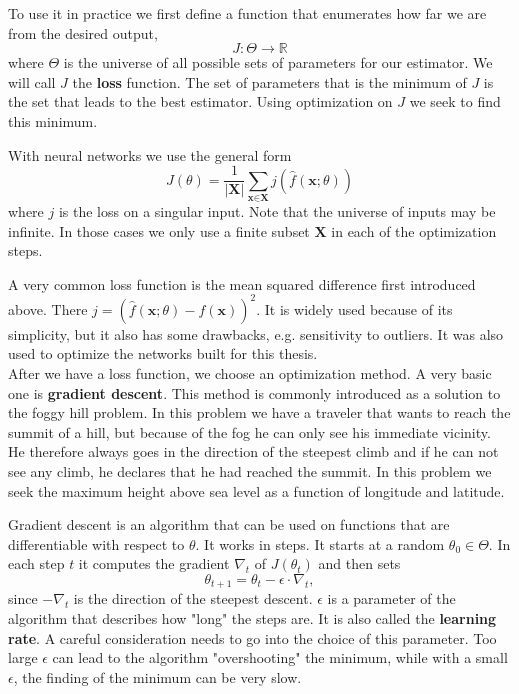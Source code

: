 To use it in practice we first define a function that enumerates how far we are from the desired output, $$J:\Theta\rightarrow\mathbb{R}$$ where $\Theta$ is the universe of all possible sets of parameters for our estimator. We will call $J$ the \textbf{loss} function. The set of parameters that is the minimum of $J$ is the set that leads to the best estimator. Using optimization on $J$ we seek to find this minimum. 

With neural networks we use the general form $$J(\theta) = \frac{1}{|\textbf{X}|} \sum_{\textbf{x}\in \textbf{X}}j(\widehat{f}(\textbf{x};\theta))$$ where $j$ is the loss on a singular input. Note that the universe of inputs may be infinite. In those cases we only use a finite subset $\textbf{X}$ in each of the optimization steps. 

A very common loss function is the mean squared difference first introduced above. There $j=(\widehat{f}(\textbf{x};\theta)-f(\textbf{x}))^2$. It is widely used because of its simplicity, but it also has some drawbacks, e.g. sensitivity to outliers. It was also used to optimize the networks built for this thesis.\\

After we have a loss function, we choose an optimization method. A very basic one is \textbf{gradient descent}. This method is commonly introduced as a solution to the foggy hill problem. In this problem we have a traveler that wants to reach the summit of a hill, but because of the fog he can only see his immediate vicinity. He therefore always goes in the direction of the steepest climb and if he can not see any climb, he declares that he had reached the summit. In this problem we seek the maximum height above sea level as a function of longitude and latitude.

Gradient descent is an algorithm that can be used on functions that are differentiable with respect to $\theta$. It works in steps. It starts at a random $\theta_0 \in \Theta$. In each step $t$ it computes the gradient $\nabla_t$ of $J(\theta_t)$ and then sets $$\theta_{t+1}=\theta_t-\epsilon\cdot\nabla_t,$$ since $-\nabla_t$ is the direction of the steepest descent. $\epsilon$ is a parameter of the algorithm that describes how "long" the steps are. It is also called the \textbf{learning rate}. A careful consideration needs to go into the choice of this parameter. Too large $\epsilon$ can lead to the algorithm "overshooting" the minimum, while with a small $\epsilon$, the finding of the minimum can be very slow.\\

